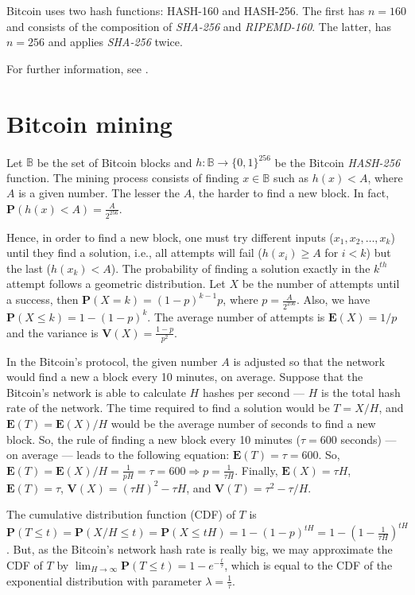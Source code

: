 Bitcoin uses two hash functions: HASH-160 and HASH-256. The first has $n=160$ and consists of the composition of \textit{SHA-256} and \textit{RIPEMD-160}. The latter, has $n=256$ and applies \textit{SHA-256} twice.

For further information, see \citet{gilbert2003security, dobbertin1996ripemd}.

\section{Bitcoin mining}

Let $\mathbb{B}$ be the set of Bitcoin blocks and $h: \mathbb{B} \rightarrow \{0, 1\}^{256}$ be the Bitcoin \textit{HASH-256} function. The mining process consists of finding $x \in \mathbb{B}$ such as $h(x) < A$, where $A$ is a given number. The lesser the $A$, the harder to find a new block. In fact, $\mathbf{P}(h(x) < A) = \frac{A}{2^{256}}$.

Hence, in order to find a new block, one must try different inputs ($x_1, x_2, \dots, x_k$) until they find a solution, i.e., all attempts will fail ($h(x_i) \geq A$ for $i < k$) but the last ($h(x_k) < A$). The probability of finding a solution exactly in the $k^{th}$ attempt follows a geometric distribution. Let $X$ be the number of attempts until a success, then $\mathbf{P}(X = k) = (1-p)^{k-1} p$, where $p = \frac{A}{2^{256}}$. Also, we have $\mathbf{P}(X \leq k) = 1 - (1-p)^k$. The average number of attempts is $\mathbf{E}(X) = 1/p$ and the variance is $\mathbf{V}(X) = \frac{1-p}{p^2}$.

In the Bitcoin's protocol, the given number $A$ is adjusted so that the network would find a new a block every 10 minutes, on average. Suppose that the Bitcoin's network is able to calculate $H$ hashes per second --- $H$ is the total hash rate of the network. The time required to find a solution would be $T=X/H$, and $\mathbf{E}(T) = \mathbf{E}(X)/H$ would be the average number of seconds to find a new block. So, the rule of finding a new block every 10 minutes ($\tau = 600$ seconds) --- on average --- leads to the following equation: $\mathbf{E}(T) = \tau = 600$. So, $\mathbf{E}(T) = \mathbf{E}(X)/H = \frac{1}{pH} = \tau = 600 \Rightarrow p = \frac{1}{\tau H}$. Finally, $\mathbf{E}(X) = \tau H$, $\mathbf{E}(T) = \tau$, $\mathbf{V}(X) = (\tau H)^2 - \tau H$, and $\mathbf{V}(T) = \tau^2 - \tau/H$.

The cumulative distribution function (CDF) of $T$ is $\mathbf{P}(T \leq t) = \mathbf{P}(X/H \leq t) = \mathbf{P}(X \leq tH) = 1 - (1-p)^{tH} = 1 - \left( 1-\frac{1}{\tau H} \right)^{tH}$. But, as the Bitcoin's network hash rate is really big, we may approximate the CDF of $T$ by $\lim_{H \rightarrow \infty} \mathbf{P}(T \leq t) = 1 - e^{-\frac{t}{\tau}}$, which is equal to the CDF of the exponential distribution with parameter $\lambda = \frac{1}{\tau}$.


